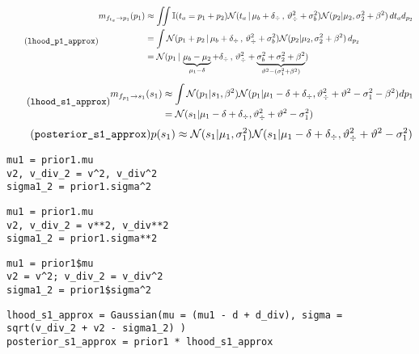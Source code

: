 \documentclass[article]{jss}
\newcommand{\N}{\mathcal{N}}
\begin{document}
%
\begin{equation}\label{eq:^m_fta_p} \tag{\texttt{lhood\_p1\_approx}}
\begin{split}
m_{f_{t_a} \rightarrow p_1}(p_1) &\approx \iint \mathbb{I}(t_a = p_1 + p_2) \N(t_a \, | \, \mu_b + \delta_{\div} \, , \, \vartheta_{\div}^2 + \sigma_b^2) \N(p_2 | \mu_2 , \sigma_2^2 + \beta^2)  \, d{t_a} d_{p_2} \\
& = \int \N(p_1 + p_2 \, | \, \mu_b + \delta_{\div} \, , \, \vartheta_{\div}^2 + \sigma_b^2) \N(p_2 | \mu_2 , \sigma_2^2+ \beta^2 )   \, d_{p_2} \\
& = \N( p_1 \,|\,  \underbrace{\mu_b - \mu_2}_{\mu_1-\delta} + \delta_{\div}  \,,\,\vartheta_{\div}^2 + \underbrace{\sigma_b^2 + \sigma_2^2 + \beta^2}_{\vartheta^2 - (\sigma_1^2 + \beta^2)})  \\
\end{split}
\end{equation}
%
\begin{equation}\label{eq:^m_fp_s} \tag{\texttt{lhood\_s1\_approx}}
\begin{split}
m_{f_{p_1} \rightarrow s_1}(s_1) & \approx \int \N(p_1|s_1,\beta^2) \N(p_1| \mu_1 - \delta + \delta_{\div}, \vartheta_{\div}^2 + \vartheta^2 - \sigma_1^2 - \beta^2)dp_1 \\
& = \N(s_1| \mu_1 - \delta + \delta_{\div}, \vartheta_{\div}^2 + \vartheta^2 - \sigma_1^2)
\end{split}
\end{equation}
%
\begin{equation}\label{eq:^p_s} \tag{\texttt{posterior\_s1\_approx}}
 p(s_1) \approx \N(s_1|\mu_1, \sigma_1^2) \N(s_1| \mu_1 - \delta + \delta_{\div}, \vartheta_{\div}^2 + \vartheta^2 - \sigma_1^2)
\end{equation}
%
\begin{paracol}{3}
\begin{lstlisting}[backgroundcolor=\color{julia},belowskip=-0.77 \baselineskip]
mu1 = prior1.mu
v2, v_div_2 = v^2, v_div^2
sigma1_2 = prior1.sigma^2
\end{lstlisting}
\switchcolumn
\begin{lstlisting}[backgroundcolor=\color{python},belowskip=-0.77 \baselineskip]
mu1 = prior1.mu
v2, v_div_2 = v**2, v_div**2 
sigma1_2 = prior1.sigma**2
\end{lstlisting}
\switchcolumn
\begin{lstlisting}[backgroundcolor=\color{r},belowskip=-0.77 \baselineskip]
mu1 = prior1$mu
v2 = v^2; v_div_2 = v_div^2
sigma1_2 = prior1$sigma^2
\end{lstlisting}
\end{paracol}
\begin{lstlisting}[backgroundcolor=\color{all}]
lhood_s1_approx = Gaussian(mu = (mu1 - d + d_div), sigma = sqrt(v_div_2 + v2 - sigma1_2) )
posterior_s1_approx = prior1 * lhood_s1_approx
\end{lstlisting}
\end{document}

